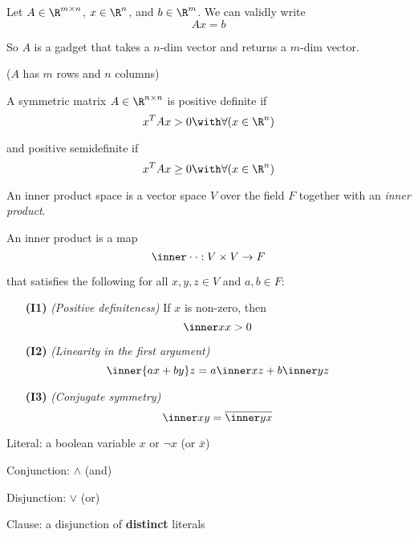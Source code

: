 Let $A\in\R^{m\times n}$, $x\in\R^n$, and $b\in\R^m$. We can validly write
$$
  Ax = b
$$

So $A$ is a gadget that takes a $n$-dim vector and returns a $m$-dim vector.

($A$ has $m$ rows and $n$ columns)

\label{e25e722}

A symmetric matrix $A\in\R^{n\times n}$ is positive definite if
$$
  x^TAx>0\with\forall(x\in\R^n)
$$

and positive semidefinite if
$$
  x^TAx\geq0\with\forall(x\in\R^n)
$$

\label{cebd07a}

An inner product space is a vector space $V$ over the field $F$ together with
an \textit{inner product}.

An inner product is a map
$$
  \inner\cdot\cdot:V\times V\to F
$$

that satisfies the following for all $x,y,z\in V$ and $a,b\in F$:
\begin{enumerate}
  \item[\textbf{(I1)}] \textit{(Positive definiteness)} If $x$ is
        non-zero, then
        $$
          \inner xx>0
        $$
  \item[\textbf{(I2)}] \textit{(Linearity in the first argument)}
        $$
          \inner{ax+by}z = a\inner xz + b\inner yz
        $$
  \item[\textbf{(I3)}] \textit{(Conjugate symmetry)}
        $$
          \inner xy=\overline{\inner yx}
        $$
\end{enumerate}


\label{ba4e2fa}

\begin{enumerata}
  \item Literal: a boolean variable $x$ or $\neg x$ (or $\bar x$)
  \item Conjunction: $\land$ (and)
  \item Disjunction: $\lor$ (or)
  \item Clause: a disjunction of \textbf{distinct} literals
\end{enumerata}

